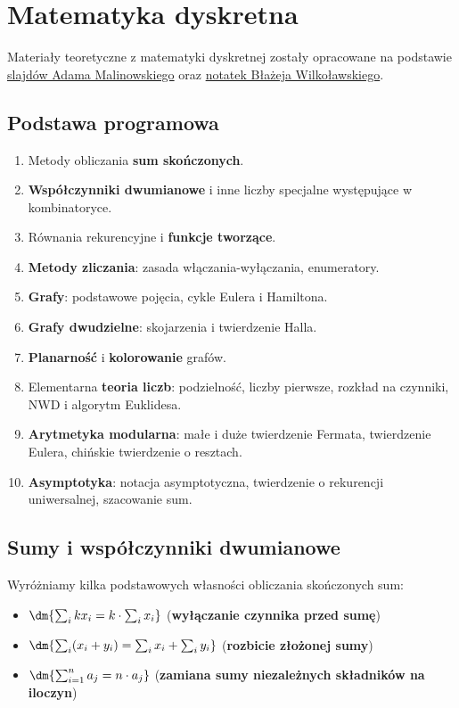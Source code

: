 \chapter{Matematyka dyskretna}

Materiały teoretyczne z matematyki dyskretnej zostały opracowane na podstawie \href{https://drive.google.com/file/d/1RMCnr61_yARrSbZ0o6CkxMwGUOtbZ5cs/view?usp=share_link}{slajdów Adama Malinowskiego} oraz \href{https://drive.google.com/file/d/17ZUGMrbKvZUqiQrVUbWwG0XOjR8ip3Q7/view?usp=share_link}{notatek Błażeja Wilkoławskiego}.

\section*{Podstawa programowa}
\begin{enumerate}
    \item Metody obliczania \textbf{sum skończonych}.
    \item \textbf{Współczynniki dwumianowe} i inne liczby specjalne występujące w kombinatoryce.
    \item Równania rekurencyjne i \textbf{funkcje tworzące}.
    \item \textbf{Metody zliczania}: zasada włączania-wyłączania, enumeratory.
    \item \textbf{Grafy}: podstawowe pojęcia, cykle Eulera i Hamiltona.
    \item \textbf{Grafy dwudzielne}: skojarzenia i twierdzenie Halla.
    \item \textbf{Planarność} i \textbf{kolorowanie} grafów.
    \item Elementarna \textbf{teoria liczb}: podzielność, liczby pierwsze, rozkład na czynniki, NWD i algorytm Euklidesa.
    \item \textbf{Arytmetyka modularna}: małe i duże twierdzenie Fermata, twierdzenie Eulera, chińskie twierdzenie o resztach.
    \item \textbf{Asymptotyka}: notacja asymptotyczna, twierdzenie o rekurencji uniwersalnej, szacowanie sum.
\end{enumerate}

\section{Sumy i współczynniki dwumianowe}

Wyróżniamy kilka podstawowych własności obliczania skończonych sum:
\begin{itemize}
    \item $\dm{\sum_i kx_i = k \cdot \sum_i x_i}$ (\textbf{wyłączanie czynnika przed sumę})
    \item $\dm{\sum_i (x_i + y_i) = \sum_i x_i + \sum_i y_i}$ (\textbf{rozbicie złożonej sumy})
    \item $\dm{\sum_{i = 1}^{n} a_j = n \cdot a_j}$ (\textbf{zamiana sumy niezależnych składników na iloczyn})
\end{itemize}

